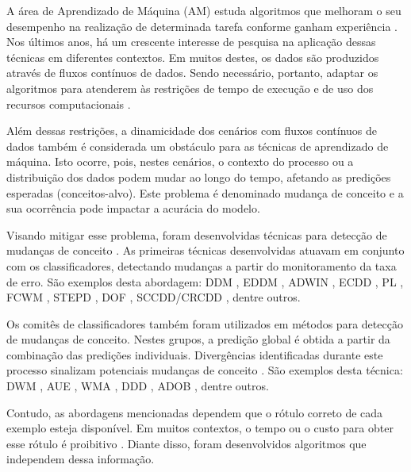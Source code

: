 \documentclass[qual, classic, a4paper]{ufbathesis}
\begin{document}
A área de Aprendizado de Máquina (AM) estuda algoritmos que melhoram o seu desempenho na realização de determinada tarefa conforme ganham experiência \cite{Mitchell:1997:ML:541177}.
Nos últimos anos, há um crescente interesse de pesquisa na aplicação dessas técnicas em diferentes contextos.
Em muitos destes, os dados são produzidos através de fluxos contínuos de dados.
Sendo necessário, portanto, adaptar os algoritmos para atenderem às restrições de tempo de execução e de uso dos recursos computacionais \cite{Bifet:2009:ALM:1656274.1656287}.

Além dessas restrições, a dinamicidade dos cenários com fluxos contínuos de dados também é considerada um obstáculo para as técnicas de aprendizado de máquina.
Isto ocorre, pois, nestes cenários, o contexto do processo ou a distribuição dos dados podem mudar ao longo do tempo, afetando as predições esperadas (conceitos-alvo).
Este problema é denominado mudança de conceito \cite{Gama:2010:KDD:1855075} e a sua ocorrência pode impactar a acurácia do modelo.

Visando mitigar esse problema, foram desenvolvidas técnicas para detecção de mudanças de conceito \cite{Gama:2014:SCD:2597757.2523813}.
As primeiras técnicas desenvolvidas atuavam em conjunto com os classificadores,  
detectando mudanças a partir do monitoramento da taxa de erro.
São exemplos desta abordagem: DDM \cite{GamaMCR04}, EDDM \cite{EDDM},  
ADWIN \cite{BifetG07}, ECDD \cite{Ross:2012:EWM:2076039.2076307}, 
PL \cite{Bach:PL:2008}, FCWM \cite{FCWM}, STEPD \cite{STEPD}, DOF \cite{Sobhani:2011:NDD:2045295.2045309}, 
SCCDD/CRCDD \cite{daCosta:2016:UDS:2956219.2956389}, dentre outros.

Os comitês de classificadores também foram utilizados em métodos para detecção de mudanças de conceito.
Nestes grupos, a predição global é obtida a partir da combinação das predições individuais.
Divergências identificadas durante este processo sinalizam potenciais mudanças de conceito \cite{Gama:2014:SCD:2597757.2523813}.
São exemplos desta técnica:
DWM \cite{Kolter:2007:DWM:1314498.1390333}, AUE \cite{AUE}, 
WMA \cite{Blum1997}, DDD \cite{Minku:2012:DNE:2197077.2197204}, ADOB \cite{deCarvalhoSantos:2014:SUR:3120352.3120365}, dentre outros.

Contudo, as abordagens mencionadas dependem que o rótulo correto de cada exemplo esteja disponível.
Em muitos contextos, o tempo ou o custo para obter esse rótulo é proibitivo \cite{Aggarwal:2006:DSM:1196418}.
Diante disso, foram desenvolvidos algoritmos que independem dessa informação.
\end{document}
